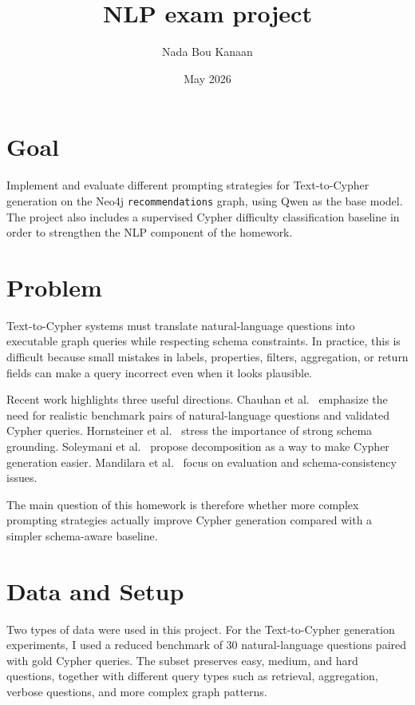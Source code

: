 \documentclass{article}
\title{NLP exam project}
\author{Nada Bou Kanaan}
\date{May 2026}
\begin{document}
\maketitle

\section{Goal}

Implement and evaluate different prompting strategies for Text-to-Cypher generation on the Neo4j \texttt{recommendations} graph, using Qwen as the base model. The project also includes a supervised Cypher difficulty classification baseline in order to strengthen the NLP component of the homework.

\section{Problem}

Text-to-Cypher systems must translate natural-language questions into executable graph queries while respecting schema constraints. In practice, this is difficult because small mistakes in labels, properties, filters, aggregation, or return fields can make a query incorrect even when it looks plausible.

Recent work highlights three useful directions. Chauhan et al.~\cite{chauhan2025mind} emphasize the need for realistic benchmark pairs of natural-language questions and validated Cypher queries. Hornsteiner et al.~\cite{hornsteiner2024realtime} stress the importance of strong schema grounding. Soleymani et al.~\cite{soleymani2025tasksplitting} propose decomposition as a way to make Cypher generation easier. Mandilara et al.~\cite{mandilara2025decoding} focus on evaluation and schema-consistency issues.

The main question of this homework is therefore whether more complex prompting strategies actually improve Cypher generation compared with a simpler schema-aware baseline.

\section{Data and Setup}

Two types of data were used in this project. For the Text-to-Cypher generation experiments, I used a reduced benchmark of 30 natural-language questions paired with gold Cypher queries.
The subset preserves easy, medium, and hard questions, together with different query types such as retrieval, aggregation, verbose questions, and more complex graph patterns.
\end{document}
